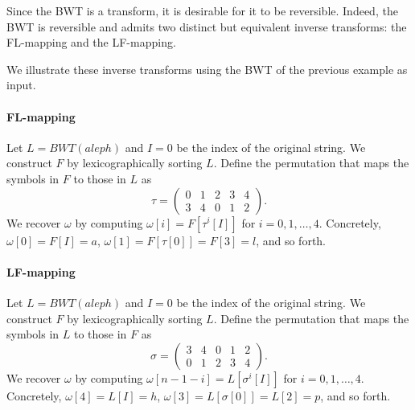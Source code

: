 \documentclass{subfiles}
\begin{document}
    Since the BWT is a transform, it is desirable for it to be reversible. 
    Indeed, the BWT is reversible and admits two distinct but equivalent 
    inverse transforms: the FL-mapping and the LF-mapping.

    We illustrate these inverse transforms using the BWT of the previous 
    example as input.

    \paragraph*{FL-mapping}
    Let \(L = BWT(aleph)\) and \(I = 0\) be the index of the original 
    string. We construct \(F\) by lexicographically sorting \(L\). 
    Define the permutation that maps the symbols in \(F\) to those in \(L\) 
    as
    \[
        \tau = \begin{pmatrix}
            0 & 1 & 2 & 3 & 4 \\ 
            3 & 4 & 0 & 1 & 2
        \end{pmatrix}\text{.}
    \]
    We recover \(\omega\) by computing \(\omega[i] = F[\tau^{i}[I]]\) for 
    \(i = 0, 1, \ldots, 4\). Concretely, 
    \(\omega[0] = F[I] = a\), \(\omega[1] = F[\tau[0]] = F[3] = l\), and 
    so forth.

    \paragraph*{LF-mapping}
    Let \(L = BWT(aleph)\) and \(I = 0\) be the index of the original string. 
    We construct \(F\) by lexicographically sorting \(L\). Define the 
    permutation that maps the symbols in \(L\) to those in \(F\) as
    \[
        \sigma = \begin{pmatrix}
            3 & 4 & 0 & 1 & 2 \\
            0 & 1 & 2 & 3 & 4
        \end{pmatrix}\text{.}
    \]
    We recover \(\omega\) by computing \(\omega[n - 1 - i] = L[\sigma^{i}[I]]\) 
    for \(i = 0, 1, \ldots, 4\). Concretely, 
    \(\omega[4] = L[I] = h\), \(\omega[3] = L[\sigma[0]] = L[2] = p\), and 
    so forth.
\end{document}
